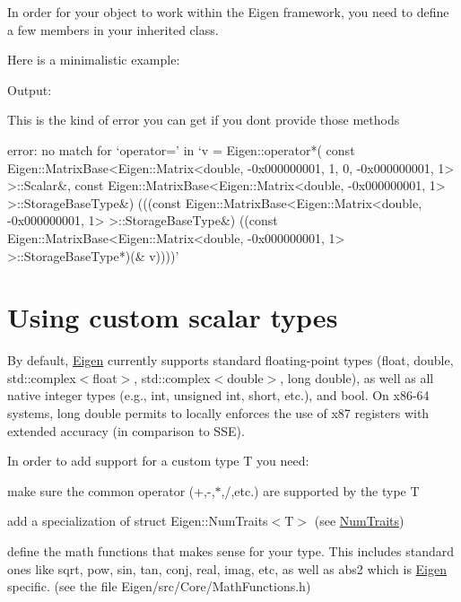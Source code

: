 In order for your object to work within the Eigen framework, you need to define a few members in your inherited class.

Here is a minimalistic example\+:


\begin{DoxyCodeInclude}
\end{DoxyCodeInclude}


Output\+: 
\begin{DoxyVerbInclude}
\end{DoxyVerbInclude}


This is the kind of error you can get if you don\textquotesingle{}t provide those methods \begin{DoxyVerb}error: no match for ‘operator=’ in ‘v = Eigen::operator*(
const Eigen::MatrixBase<Eigen::Matrix<double, -0x000000001, 1, 0, -0x000000001, 1> >::Scalar&, 
const Eigen::MatrixBase<Eigen::Matrix<double, -0x000000001, 1> >::StorageBaseType&)
(((const Eigen::MatrixBase<Eigen::Matrix<double, -0x000000001, 1> >::StorageBaseType&)
((const Eigen::MatrixBase<Eigen::Matrix<double, -0x000000001, 1> >::StorageBaseType*)(& v))))’
\end{DoxyVerb}
 \hypertarget{TopicCustomizing_CustomScalar}{}\section{Using custom scalar types}\label{TopicCustomizing_CustomScalar}
\label{_topic_customizing__custom_scalar_user_defined_scalars}%
%
 By default, \hyperlink{namespace_eigen}{Eigen} currently supports standard floating-\/point types ({\ttfamily float}, {\ttfamily double}, {\ttfamily std\+::complex$<$float$>$}, {\ttfamily std\+::complex$<$double$>$}, {\ttfamily long} {\ttfamily double}), as well as all native integer types (e.\+g., {\ttfamily int}, {\ttfamily unsigned} {\ttfamily int}, {\ttfamily short}, etc.), and {\ttfamily bool}. On x86-\/64 systems, {\ttfamily long} {\ttfamily double} permits to locally enforces the use of x87 registers with extended accuracy (in comparison to S\+SE).

In order to add support for a custom type {\ttfamily T} you need\+:
\begin{DoxyEnumerate}
\item make sure the common operator (+,-\/,$\ast$,/,etc.) are supported by the type {\ttfamily T} 
\item add a specialization of struct Eigen\+::\+Num\+Traits$<$\+T$>$ (see \hyperlink{group___core___module}{Num\+Traits})
\item define the math functions that makes sense for your type. This includes standard ones like sqrt, pow, sin, tan, conj, real, imag, etc, as well as abs2 which is \hyperlink{namespace_eigen}{Eigen} specific. (see the file Eigen/src/\+Core/\+Math\+Functions.\+h)
\end{DoxyEnumerate}

